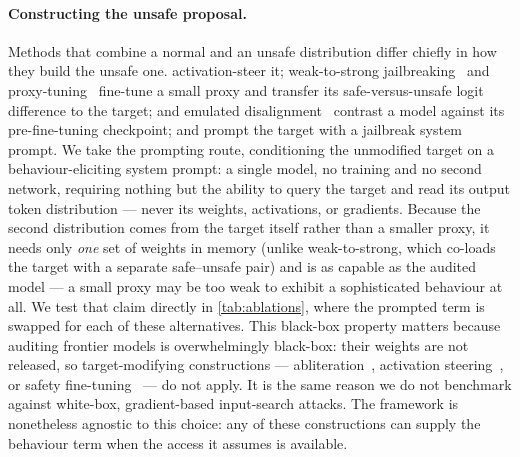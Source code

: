 \documentclass{article}
\theoremstyle{plain}
\theoremstyle{definition}
\theoremstyle{remark}
\begin{document}
\paragraph{Constructing the unsafe proposal.}
Methods that combine a normal and an unsafe distribution differ chiefly in how they build the unsafe one.
\citet{angell2026tail} activation-steer it; weak-to-strong jailbreaking~\citep{zhao2024weak} and proxy-tuning~\citep{liu2024proxy} fine-tune a small proxy and transfer its safe-versus-unsafe logit difference to the target; \citet{aranguri2025diffamp} and emulated disalignment~\citep{zhou2024emulated} contrast a model against its pre-fine-tuning checkpoint; and \citet{chowdhury2025pathological} prompt the target with a jailbreak system prompt.
We take the prompting route, conditioning the unmodified target on a behaviour-eliciting system prompt: a single model, no training and no second network, requiring nothing but the ability to query the target and read its output token distribution --- never its weights, activations, or gradients.
Because the second distribution comes from the target itself rather than a smaller proxy, it needs only \emph{one} set of weights in memory (unlike weak-to-strong, which co-loads the target with a separate safe--unsafe pair) and is as capable as the audited model --- a small proxy may be too weak to exhibit a sophisticated behaviour at all. We test that claim directly in \cref{tab:ablations}, where the prompted term is swapped for each of these alternatives.
This black-box property matters because auditing frontier models is overwhelmingly black-box: their weights are not released, so target-modifying constructions --- abliteration~\citep{arditi2024refusal}, activation steering~\citep{rimsky2024caa,zou2023repe}, or safety fine-tuning~\citep{qi2024finetuning} --- do not apply.
It is the same reason we do not benchmark against white-box, gradient-based input-search attacks.
The framework is nonetheless agnostic to this choice: any of these constructions can supply the behaviour term when the access it assumes is available.
\end{document}
